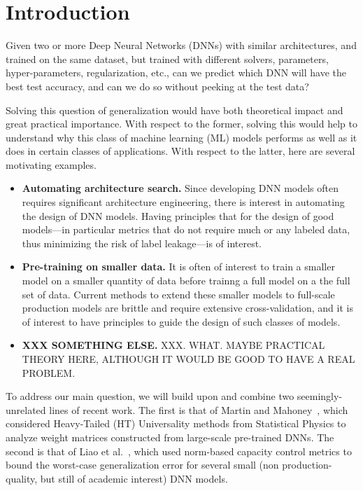 
\section{Introduction}
\label{sxn:intro}

Given two or more Deep Neural Networks (DNNs) with  similar architectures, and trained on the same dataset, but trained with different solvers, parameters, hyper-parameters, regularization, etc., can we predict which DNN will have the best test accuracy, and can we do so without peeking at the test data?   

Solving this question of generalization would have both theoretical impact and great practical importance. 
With respect to the former, solving this would help to understand why this class of machine learning (ML) models performs as well as it does in certain classes of applications.
With respect to the latter, here are several motivating examples.
\begin{itemize}
\item
\textbf{Automating architecture search.}
Since developing DNN models often requires significant architecture engineering, there is interest in automating the design of DNN models.
Having principles that for the design of good models---in particular metrics that do not require much or any labeled data, thus minimizing the risk of label leakage---is of interest.
\item
\textbf{Pre-training on smaller data.}
It is often of interest to train a smaller model on a smaller quantity of data before trainng a full model on a the full set of data.
Current methods to extend these smaller models to full-scale production models are brittle and require extensive cross-validation, and it is of interest to have principles to guide the design of such classes of models.
\item
\textbf{XXX SOMETHING ELSE.}
XXX.  WHAT.  MAYBE PRACTICAL THEORY HERE, ALTHOUGH IT WOULD BE GOOD TO HAVE A REAL PROBLEM.
\end{itemize}

To address our main question, we will build upon and combine two seemingly-unrelated lines of recent work.
The first is that of Martin and Mahoney~\cite{MM17_TR,MM18_TR}, which considered Heavy-Tailed (HT) Universality methods from Statistical Physics to analyze weight matrices constructed from large-scale pre-trained DNNs.
The second is that of Liao et al.~\cite{LMBx18_TR}, which used norm-based capacity control metrics to bound the worst-case generalization error for several small (non production-quality, but still of academic interest) DNN models.


